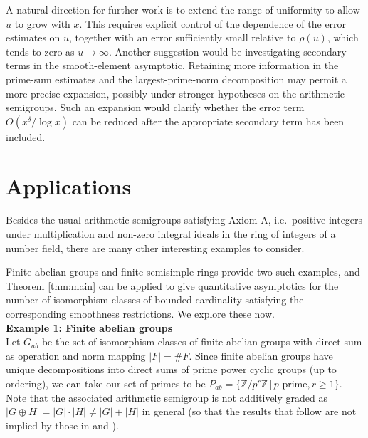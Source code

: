 \documentclass[a4paper]{amsart}
\begin{document}
A natural direction for further work is to extend the range of uniformity to allow $u$ to grow with $x$. This requires explicit control of the dependence of the error estimates on $u$, together with an error sufficiently small relative to $\rho(u)$, which tends to zero as $u\to\infty$.
Another suggestion would be investigating secondary terms in the smooth-element asymptotic. Retaining more information in the prime-sum estimates and the largest-prime-norm decomposition may permit a more precise expansion, possibly under stronger hypotheses on the arithmetic semigroups. Such an expansion would clarify whether the error term $O(x^\delta/\log x)$ can be reduced after the appropriate secondary term has been included.


\section{Applications}\label{sec:app}
 Besides the usual arithmetic semigroups satisfying Axiom A, i.e.\ positive integers under multiplication and non-zero integral ideals in the ring of integers of a number field, there are many other interesting examples to consider. 
 
 Finite abelian groups and finite semisimple rings provide two such examples, and Theorem \ref{thm:main} can be applied to give quantitative asymptotics for the number of isomorphism classes of bounded cardinality satisfying the corresponding smoothness restrictions. We explore these now.\\

\textbf{Example 1: Finite abelian groups}\\
Let $G_{ab}$ be the set of isomorphism classes of finite abelian
  groups with direct sum as operation and norm mapping $|F| = \# F$. Since finite abelian groups have unique decompositions into direct sums of prime power cyclic groups (up to ordering), we can take our set of primes to be $P_{ab} = \{\mathbb{Z}/p^r\mathbb{Z} \,|\, p \text{ prime}, r\ge 1\}$. Note that the associated arithmetic semigroup is not additively graded as $|G\oplus H| = |G|\cdot |H| \neq |G| + |H|$ in general (so that the results that follow are not implied by those in \cite{warlimont1991arithmetical} and \cite{manstavivcius1992remarks}).\\
  
\end{document}
